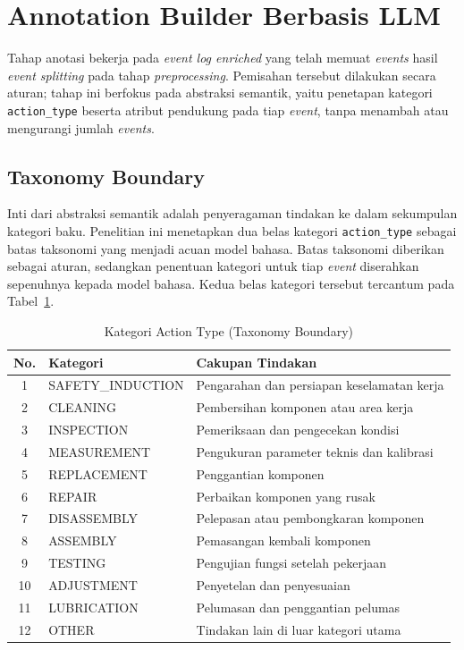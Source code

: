 \section{Annotation Builder Berbasis LLM}
\label{subsec:annotation-builder}

Tahap anotasi bekerja pada \textit{event log enriched} yang telah memuat \textit{events} hasil \textit{event splitting} pada tahap \textit{preprocessing}. Pemisahan tersebut dilakukan secara aturan; tahap ini berfokus pada abstraksi semantik, yaitu penetapan kategori \texttt{action\_type} beserta atribut pendukung pada tiap \textit{event}, tanpa menambah atau mengurangi jumlah \textit{events}.

\subsection{Taxonomy Boundary}

Inti dari abstraksi semantik adalah penyeragaman tindakan ke dalam sekumpulan kategori baku. Penelitian ini menetapkan dua belas kategori \texttt{action\_type} sebagai batas taksonomi yang menjadi acuan model bahasa. Batas taksonomi diberikan sebagai aturan, sedangkan penentuan kategori untuk tiap \textit{event} diserahkan sepenuhnya kepada model bahasa. Kedua belas kategori tersebut tercantum pada Tabel~\ref{tab:taxonomy_boundary}.

\begin{table}[H]
\centering
\caption{Kategori Action Type (Taxonomy Boundary)}
\label{tab:taxonomy_boundary}
\small
\begin{tabularx}{\textwidth}{c l X}
\toprule
\textbf{No.} & \textbf{Kategori} & \textbf{Cakupan Tindakan} \\
\midrule
1 & SAFETY\_INDUCTION & Pengarahan dan persiapan keselamatan kerja \\
2 & CLEANING & Pembersihan komponen atau area kerja \\
3 & INSPECTION & Pemeriksaan dan pengecekan kondisi \\
4 & MEASUREMENT & Pengukuran parameter teknis dan kalibrasi \\
5 & REPLACEMENT & Penggantian komponen \\
6 & REPAIR & Perbaikan komponen yang rusak \\
7 & DISASSEMBLY & Pelepasan atau pembongkaran komponen \\
8 & ASSEMBLY & Pemasangan kembali komponen \\
9 & TESTING & Pengujian fungsi setelah pekerjaan \\
10 & ADJUSTMENT & Penyetelan dan penyesuaian \\
11 & LUBRICATION & Pelumasan dan penggantian pelumas \\
12 & OTHER & Tindakan lain di luar kategori utama \\
\bottomrule
\end{tabularx}
\end{table}


